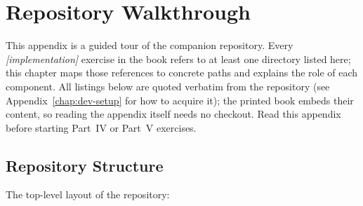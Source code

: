 \chapter{Repository Walkthrough}
\label{chap:repo-walkthrough}

This appendix is a guided tour of the companion repository.  Every
\emph{[implementation]} exercise in the book refers to at least one
directory listed here; this chapter maps those references to concrete
paths and explains the role of each component.  All listings below are
quoted verbatim from the repository (see Appendix~\ref{chap:dev-setup} for
how to acquire it); the printed book embeds their content, so reading the
appendix itself needs no checkout.  Read this appendix before
starting Part~IV or Part~V exercises.

\section{Repository Structure}
\label{sec:repo-structure}

The top-level layout of the repository:


